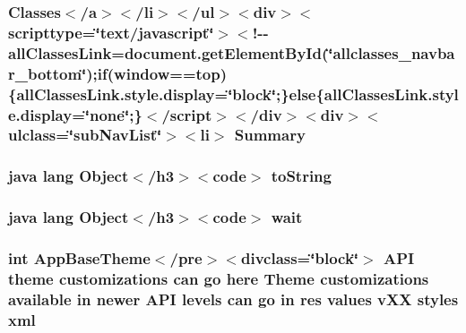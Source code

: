 \hypertarget{_r_8style_8html_a6f9ab45abc9b0679dc1b132fbacfc681}{
\subsubsection[{Summary}]{\setlength{\rightskip}{0pt plus 5cm}Classes$<$/{\bf a}$>$$<$/li$>$$<$/ul$>$$<$div$>$$<$scripttype=\char`\"{}text/javascript\char`\"{}$>$$<$!-\/-\/all\-Classes\-Link=document.\-get\-Element\-By\-Id(\char`\"{}allclasses\-\_\-navbar\-\_\-bottom\char`\"{});if(window==top)\{all\-Classes\-Link.\-style.\-display=\char`\"{}block\char`\"{};\}else\{all\-Classes\-Link.\-style.\-display=\char`\"{}none\char`\"{};\}$<$/script$>$$<$/div$>$$<$div$>$$<$ulclass=\char`\"{}sub\-Nav\-List\char`\"{}$>$$<$li$>$ Summary}}\label{_r_8style_8html_a6f9ab45abc9b0679dc1b132fbacfc681}
\hypertarget{_r_8style_8html_a36e8a76a4132c9a7081416f27d087615}{
\subsubsection[{to\-String}]{\setlength{\rightskip}{0pt plus 5cm}java lang Object$<$/h3$>$$<$code$>$ to\-String}}\label{_r_8style_8html_a36e8a76a4132c9a7081416f27d087615}
\hypertarget{_r_8style_8html_a9a9f0c22e5688d478c707f910f1c1aea}{
\subsubsection[{wait}]{\setlength{\rightskip}{0pt plus 5cm}java lang Object$<$/h3$>$$<$code$>$ wait}}\label{_r_8style_8html_a9a9f0c22e5688d478c707f910f1c1aea}
\hypertarget{_r_8style_8html_a35799d842f613907c3a5aaacad40c6c9}{
\subsubsection[{xml}]{\setlength{\rightskip}{0pt plus 5cm}int App\-Base\-Theme$<$/pre$>$$<$divclass=\char`\"{}block\char`\"{}$>$ A\-P\-I theme customizations can go here Theme customizations available in newer {\bf A\-P\-I} levels can go in res values v\-X\-X styles xml}}\label{_r_8style_8html_a35799d842f613907c3a5aaacad40c6c9}
